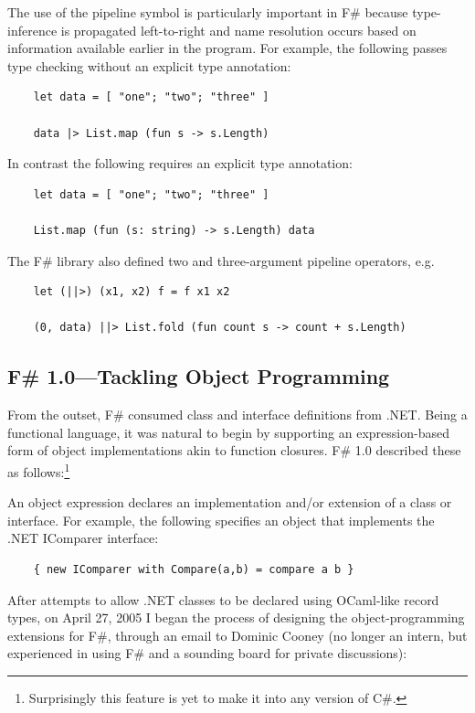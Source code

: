 \documentclass[acmsmall]{acmart}\settopmatter{}
\begin{document}
The use of the pipeline symbol is particularly important in F\# because type-inference is propagated left-to-right and name resolution occurs based on information available earlier in the program.  For example, the following passes type checking without an explicit type annotation:
\begin{verbatim}
    let data = [ "one"; "two"; "three" ] 

    data |> List.map (fun s -> s.Length)
\end{verbatim}
In contrast the following requires an explicit type annotation:
\begin{verbatim}
    let data = [ "one"; "two"; "three" ] 

    List.map (fun (s: string) -> s.Length) data
\end{verbatim}
The F\# library also defined two and three-argument pipeline operators, e.g.
\begin{verbatim}
    let (||>) (x1, x2) f = f x1 x2

    (0, data) ||> List.fold (fun count s -> count + s.Length)
\end{verbatim}

\subsection*{F\# 1.0---Tackling Object Programming}

From the outset, F\# consumed class and interface definitions from .NET. Being a functional language, it was
natural to begin by supporting an expression-based form of object implementations akin to function closures.  F\# 1.0 described these as follows:\footnote{Surprisingly this feature is yet to make it into any version of C\#.}
\begin{verbquote}
An object expression declares an implementation and/or extension of a class or interface. For example, the following specifies an object that implements the .NET IComparer interface:
\end{verbquote}
\begin{verbatim}
    { new IComparer with Compare(a,b) = compare a b }
\end{verbatim}
After attempts to allow .NET classes to be declared using OCaml-like record types, on April 27, 2005 I began the process of designing the object-programming extensions for F\#, through an email to Dominic Cooney (no longer an intern, but experienced in using F\# and a sounding board for private discussions):
\end{document}

